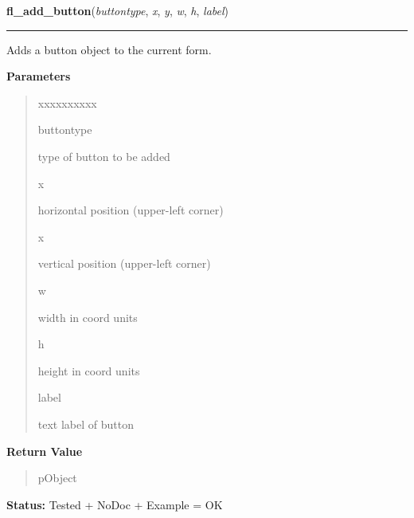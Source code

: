     \label{xformslib:library:fl_add_button}

    \vspace{0.5ex}

\hspace{.8\funcindent}\begin{boxedminipage}{\funcwidth}

    \raggedright \textbf{fl\_add\_button}(\textit{buttontype}, \textit{x}, \textit{y}, \textit{w}, \textit{h}, \textit{label})

    \vspace{-1.5ex}

    \rule{\textwidth}{0.5\fboxrule}
\setlength{\parskip}{2ex}
    Adds a button object to the current form.

\setlength{\parskip}{1ex}
      \textbf{Parameters}
      \vspace{-1ex}

      \begin{quote}
        \begin{Ventry}{xxxxxxxxxx}

          \item[buttontype]

          type of button to be added

          \item[x]

          horizontal position (upper-left corner)

          \item[x]

          vertical position (upper-left corner)

          \item[w]

          width in coord units

          \item[h]

          height in coord units

          \item[label]

          text label of button

        \end{Ventry}

      \end{quote}

      \textbf{Return Value}
    \vspace{-1ex}

      \begin{quote}
      pObject

      \end{quote}

\textbf{Status:} Tested + NoDoc + Example = OK



    \end{boxedminipage}

